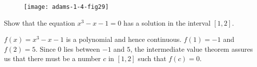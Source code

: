 \documentclass[../main.tex]{subfiles}
\begin{document}
\begin{figure}[H]
    \centering
    \texttt{[image: adams-1-4-fig29]}
\end{figure}

\begin{example}
    Show that the equation $x^3 - x - 1 = 0$ has a solution in the interval $[1, 2]$.
\end{example}

\begin{solution}
    $f(x) = x^3 - x - 1$ is a polynomial and hence continuous. $f(1) = -1$ and $f(2) = 5$. Since $0$ lies between $-1$ and $5$, the intermediate value theorem assures us that there must be a number $c$ in $[1, 2]$ such that $f(c) = 0$.
\end{solution}
\end{document}
